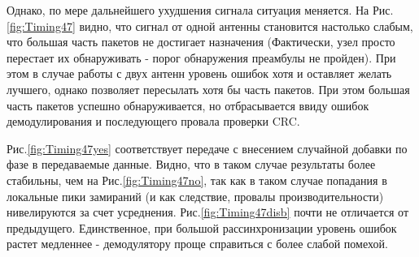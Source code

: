 \documentclass[a4paper,12pt,oneside]{scrartcl}
\begin{document}

\FloatBarrier
Однако, по мере дальнейшего ухудшения сигнала ситуация меняется. 
На Рис.\ref{fig:Timing47} видно, что сигнал от одной антенны становится настолько слабым, что большая часть пакетов не достигает назначения (Фактически, узел просто перестает их обнаруживать - порог обнаружения преамбулы не пройден). 
При этом в случае работы с двух антенн уровень ошибок хотя и оставляет желать лучшего, однако позволяет пересылать хотя бы часть пакетов.
При этом большая часть пакетов успешно обнаруживается, но отбрасывается ввиду ошибок демодулирования и последующего провала проверки CRC.

Рис.\ref{fig:Timing47yes} соответствует передаче с внесением случайной добавки по фазе в передаваемые данные. 
Видно, что в таком случае результаты более стабильны, чем на Рис.\ref{fig:Timing47no}, так как в таком случае попадания в локальные пики замираний (и как следствие, провалы производительности) нивелируются за счет усреднения.
Рис.\ref{fig:Timing47disb} почти не отличается от предыдущего. Единственное, при большой рассинхронизации уровень ошибок растет медленнее - демодулятору проще справиться с более слабой помехой.
\end{document}
